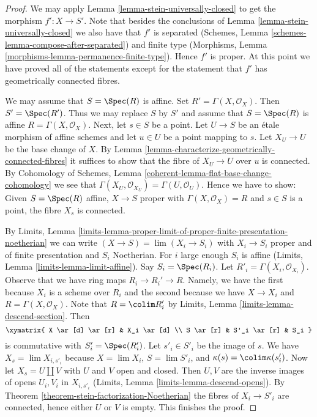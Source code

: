 \begin{proof}
We may apply Lemma \ref{lemma-stein-universally-closed} to get the
morphism $f' : X \to S'$.
Note that besides the
conclusions of Lemma \ref{lemma-stein-universally-closed} we
also have that $f'$ is separated
(Schemes, Lemma \ref{schemes-lemma-compose-after-separated})
and finite type
(Morphisms, Lemma \ref{morphisms-lemma-permanence-finite-type}).
Hence $f'$ is proper. At this point we have proved all of the
statements except for the statement
that $f'$ has geometrically connected fibres.

\medskip\noindent
We may assume that $S = \Spec(R)$ is affine.
Set $R' = \Gamma(X, \mathcal{O}_X)$. Then $S' = \Spec(R')$.
Thus we may replace $S$ by $S'$ and assume that
$S = \Spec(R)$ is affine $R = \Gamma(X, \mathcal{O}_X)$.
Next, let $s \in S$ be a point. Let $U \to S$ be an \'etale morphism
of affine schemes and let $u \in U$ be a point mapping to $s$.
Let $X_U \to U$ be the base change of $X$. By
Lemma \ref{lemma-characterize-geometrically-connected-fibres}
it suffices to show that the fibre of $X_U \to U$ over $u$ is
connected. By
Cohomology of Schemes, Lemma \ref{coherent-lemma-flat-base-change-cohomology}
we see that
$\Gamma(X_U, \mathcal{O}_{X_U}) = \Gamma(U, \mathcal{O}_U)$.
Hence we have to show: Given
$S = \Spec(R)$ affine, $X \to S$ proper with $\Gamma(X, \mathcal{O}_X) = R$
and $s \in S$ is a point, the fibre $X_s$ is connected.

\medskip\noindent
By Limits, Lemma
\ref{limits-lemma-proper-limit-of-proper-finite-presentation-noetherian}
we can write $(X \to S) = \lim (X_i \to S_i)$ with $X_i \to S_i$
proper and of finite presentation and $S_i$ Noetherian. For $i$ large
enough $S_i$ is affine (Limits, Lemma \ref{limits-lemma-limit-affine}).
Say $S_i = \Spec(R_i)$. Let $R'_i = \Gamma(X_i, \mathcal{O}_{X_i})$.
Observe that we have ring maps $R_i \to R_i' \to R$. Namely, we have
the first because $X_i$ is a scheme over $R_i$ and the second because
we have $X \to X_i$ and $R = \Gamma(X, \mathcal{O}_X)$. Note that
$R = \colim R'_i$ by Limits, Lemma \ref{limits-lemma-descend-section}.
Then 
$$
\xymatrix{
X \ar[d]  \ar[r] & X_i \ar[d] \\
S \ar[r] & S'_i \ar[r] & S_i
}
$$
is commutative with $S'_i = \Spec(R'_i)$.
Let $s'_i \in S'_i$ be the image of $s$.
We have $X_s = \lim X_{i, s'_i}$ because $X = \lim X_i$,
$S = \lim S'_i$, and $\kappa(s) = \colim \kappa(s'_i)$.
Now let $X_s = U \amalg V$ with $U$ and $V$ open and closed.
Then $U, V$ are the inverse images of opens $U_i, V_i$ in $X_{i, s'_i}$
(Limits, Lemma \ref{limits-lemma-descend-opens}).
By Theorem \ref{theorem-stein-factorization-Noetherian} the fibres
of $X_i \to S'_i$ are connected, hence either $U$ or $V$ is empty.
This finishes the proof.
\end{proof}

